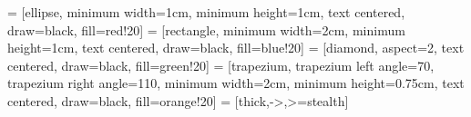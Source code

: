 \usepackage{tikz}
\usetikzlibrary{shapes.geometric, arrows}

 = [ellipse, minimum width=1cm, minimum height=1cm,
    text centered, draw=black, fill=red!20]
 = [rectangle, minimum width=2cm, minimum height=1cm,
    text centered, draw=black, fill=blue!20]
 = [diamond, aspect=2,
    text centered, draw=black, fill=green!20]
 = [trapezium, trapezium left angle=70, trapezium right angle=110,
    minimum width=2cm, minimum height=0.75cm, text centered, draw=black, fill=orange!20]
 = [thick,->,>=stealth]